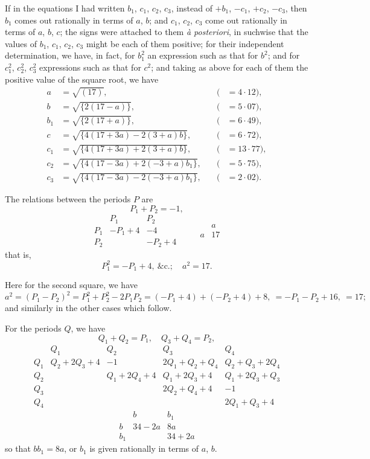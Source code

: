 \documentclass[11pt,a4paper]{article}
\begin{document}
If in the equations I had written $b_1$, $c_1$, $c_2$, $c_3$, instead of $+ b_1$, $- c_1$, $+ c_2$, $- c_3$, then $b_1$ comes out rationally in terms of $a$, $b$; and $c_1$, $c_2$, $c_3$ come out rationally in terms of $a$, $b$, $c$; the signs were attached to them \emph{à posteriori}, in suchwise that the values of $b_1$, $c_1$, $c_2$, $c_3$ might be each of them positive; for their independent determination, we have, in fact, for $b_1^2$ an expression such as that for $b^2$; and for $c_1^2$, $c_2^2$, $c_3^2$ expressions such as that for $c^2$; and taking as above for each of them the positive value of the square root, we have
\begin{align*}
a &= \sqrt{(17)},\quad & (&= 4{\cdot}12),\\
b &= \sqrt{\{2(17 - a)\}},\quad & (&= 5{\cdot}07),\\
b_1 &= \sqrt{\{2(17 + a)\}},\quad & (&= 6{\cdot}49),\\
c &= \sqrt{\{4(17 + 3a) - 2(3 + a)b\}},\quad & (&= 6{\cdot}72),\\
c_1 &= \sqrt{\{4(17 + 3a) + 2(3 + a)b\}},\quad & (&= 13{\cdot}77),\\
c_2 &= \sqrt{\{4(17 - 3a) + 2(-3 + a)b_1\}},\quad & (&= 5{\cdot}75),\\
c_3 &= \sqrt{\{4(17 - 3a) - 2(-3 + a)b_1\}},\quad & (&= 2{\cdot}02).
\end{align*}

The relations between the periods $P$ are
\[
P_1 + P_2 = - 1,
\]
\[
\begin{array}{c|c|c}
 & P_1 & P_2 \\\hline
P_1 & -P_1 + 4 & -4 \\\hline
P_2 &          & -P_2 + 4
\end{array}
\qquad
\begin{array}{c|c}
 & a \\\hline
a & 17
\end{array}
\]
that is,
\[
P_1^2 = - P_1 + 4,\ \&\text{c.};\quad a^2 = 17.
\]

Here for the second square, we have
\[
a^2 = (P_1 - P_2)^2 = P_1^2 + P_2^2 - 2 P_1 P_2 = (- P_1 + 4) + (- P_2 + 4) + 8,\ = - P_1 - P_2 + 16,\ = 17;
\]
and similarly in the other cases which follow.

For the periods $Q$, we have
\[
Q_1 + Q_2 = P_1,\quad Q_3 + Q_4 = P_2,
\]
\[
\begin{array}{c|c|c|c|c}
 & Q_1 & Q_2 & Q_3 & Q_4 \\\hline
Q_1 & Q_2 + 2 Q_3 + 4 & -1 & 2 Q_1 + Q_2 + Q_4 & Q_2 + Q_3 + 2 Q_4 \\\hline
Q_2 &  & Q_1 + 2 Q_4 + 4 & Q_1 + 2 Q_3 + 4 & Q_1 + 2 Q_3 + Q_3 \\\hline
Q_3 &  &  & 2 Q_2 + Q_4 + 4 & -1 \\\hline
Q_4 &  &  &  & 2 Q_1 + Q_3 + 4
\end{array}
\]
\[
\begin{array}{c|c|c}
 & b & b_1 \\\hline
b & 34 - 2a & 8a \\\hline
b_1 &  & 34 + 2a
\end{array}
\]
so that $b b_1 = 8a$, or $b_1$ is given rationally in terms of $a$, $b$.
\end{document}
